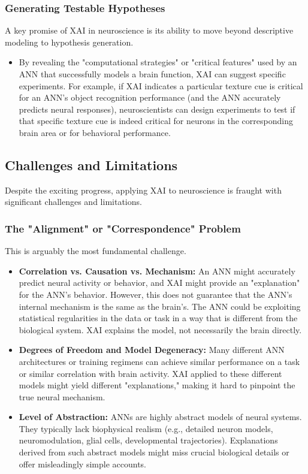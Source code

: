 \documentclass[11pt,a4paper]{article}
\begin{document}
\subsubsection{Generating Testable Hypotheses}
A key promise of XAI in neuroscience is its ability to move beyond descriptive modeling to hypothesis generation.
\begin{itemize}
    \item By revealing the "computational strategies" or "critical features" used by an ANN that successfully models a brain function, XAI can suggest specific experiments. For example, if XAI indicates a particular texture cue is critical for an ANN's object recognition performance (and the ANN accurately predicts neural responses), neuroscientists can design experiments to test if that specific texture cue is indeed critical for neurons in the corresponding brain area or for behavioral performance.
\end{itemize}

\subsection{Challenges and Limitations}

Despite the exciting progress, applying XAI to neuroscience is fraught with significant challenges and limitations.

\subsubsection{The "Alignment" or "Correspondence" Problem}
This is arguably the most fundamental challenge.
\begin{itemize}
    \item \textbf{Correlation vs. Causation vs. Mechanism:} An ANN might accurately predict neural activity or behavior, and XAI might provide an "explanation" for the ANN's behavior. However, this does not guarantee that the ANN's internal mechanism is the same as the brain's. The ANN could be exploiting statistical regularities in the data or task in a way that is different from the biological system. XAI explains the model, not necessarily the brain directly.
    \item \textbf{Degrees of Freedom and Model Degeneracy:} Many different ANN architectures or training regimens can achieve similar performance on a task or similar correlation with brain activity. XAI applied to these different models might yield different "explanations," making it hard to pinpoint the true neural mechanism.
    \item \textbf{Level of Abstraction:} ANNs are highly abstract models of neural systems. They typically lack biophysical realism (e.g., detailed neuron models, neuromodulation, glial cells, developmental trajectories). Explanations derived from such abstract models might miss crucial biological details or offer misleadingly simple accounts.
\end{itemize}
\end{document}
